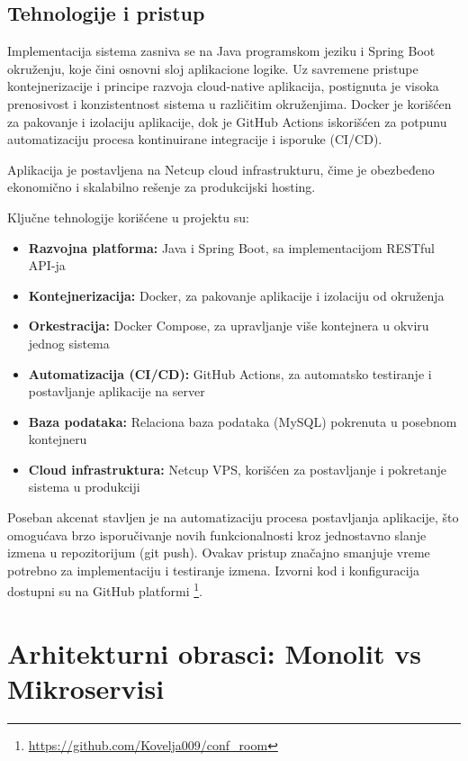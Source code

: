 \documentclass[12pt]{article}
\begin{document}
    \subsection{Tehnologije i pristup}

    Implementacija sistema zasniva se na Java programskom jeziku i Spring Boot okruženju, koje čini osnovni sloj aplikacione logike. Uz savremene pristupe kontejnerizacije i principe razvoja cloud-native aplikacija, postignuta je visoka prenosivost i konzistentnost sistema u različitim okruženjima. Docker je korišćen za pakovanje i izolaciju aplikacije, dok je GitHub Actions iskorišćen za potpunu automatizaciju procesa kontinuirane integracije i isporuke (CI/CD).

    Aplikacija je postavljena na Netcup cloud infrastrukturu, čime je obezbeđeno ekonomično i skalabilno rešenje za produkcijski hosting.

    Ključne tehnologije korišćene u projektu su:
    \begin{itemize}
    \item \textbf{Razvojna platforma:} Java i Spring Boot, sa implementacijom RESTful API-ja  
    \item \textbf{Kontejnerizacija:} Docker, za pakovanje aplikacije i izolaciju od okruženja  
    \item \textbf{Orkestracija:} Docker Compose, za upravljanje više kontejnera u okviru jednog sistema  
    \item \textbf{Automatizacija (CI/CD):} GitHub Actions, za automatsko testiranje i postavljanje aplikacije na server  
    \item \textbf{Baza podataka:} Relaciona baza podataka (MySQL) pokrenuta u posebnom kontejneru  
    \item \textbf{Cloud infrastruktura:} Netcup VPS, korišćen za postavljanje i pokretanje sistema u produkciji
    \end{itemize}
    
    Poseban akcenat stavljen je na automatizaciju procesa postavljanja aplikacije, što omogućava brzo isporučivanje novih funkcionalnosti kroz jednostavno slanje izmena u repozitorijum (git push). Ovakav pristup značajno smanjuje vreme potrebno za implementaciju i testiranje izmena.
    Izvorni kod i konfiguracija dostupni su na GitHub platformi \footnote{\url{https://github.com/Kovelja009/conf_room}}.

    \section{Arhitekturni obrasci: Monolit vs Mikroservisi}
\end{document}
